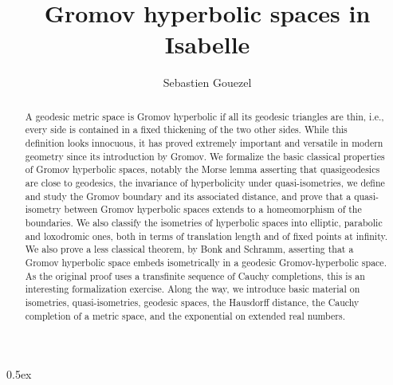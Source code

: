 \documentclass[11pt,a4paper]{article}
\begin{document}
\title{Gromov hyperbolic spaces in Isabelle}
\author{Sebastien Gouezel}
\date{}
\maketitle

\begin{abstract}
A geodesic metric space is Gromov hyperbolic if all its geodesic triangles
are thin, i.e., every side is contained in a fixed thickening of the two
other sides. While this definition looks innocuous, it has proved extremely
important and versatile in modern geometry since its introduction by
Gromov. We formalize the basic classical properties of Gromov hyperbolic
spaces, notably the Morse lemma asserting that quasigeodesics are close to
geodesics, the invariance of hyperbolicity under quasi-isometries, we
define and study the Gromov boundary and its associated distance, and prove
that a quasi-isometry between Gromov hyperbolic spaces extends to a
homeomorphism of the boundaries. We also classify the isometries of
hyperbolic spaces into elliptic, parabolic and loxodromic ones, both in
terms of translation length and of fixed points at infinity. We also prove
a less classical theorem, by Bonk and Schramm, asserting that a Gromov
hyperbolic space embeds isometrically in a geodesic Gromov-hyperbolic
space. As the original proof uses a transfinite sequence of Cauchy
completions, this is an interesting formalization exercise. Along the way,
we introduce basic material on isometries, quasi-isometries, geodesic
spaces, the Hausdorff distance, the Cauchy completion of a metric space,
and the exponential on extended real numbers.
\end{abstract}

\tableofcontents

\parindent 0pt\parskip 0.5ex





\end{document}
